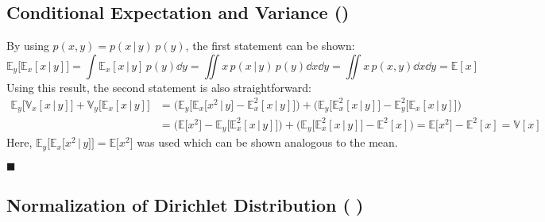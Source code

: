 \documentclass[11pt, a4paper]{scrartcl}
\newcommand{\E}{\mathbb{E}}
\newcommand{\Var}{\mathbb{V}}
\newcommand{\given}{\,\vert\,}
\newcommand{\biggiven}{\,\big\vert\,}
\newcommand{\eot}{\hfill\(\blacksquare\)}
\newcommand{\diffstar}{\texorpdfstring{\raisebox{-1pt}{\resizebox{!}{8pt}{\(\star\)}}}{*}}
\newcommand{\onestar}  {(\diffstar)}
\newcommand{\threestar}{(\diffstar\,\diffstar\,\diffstar)}
\begin{document}
		\subsection{Conditional Expectation and Variance  \onestar}
			By using \( p(x, y) = p(x \given y) \, p(y) \), the first statement can be shown:
			\begin{equation}
				\E_y\big[ \E_x[x \given y] \big]
					= \int\! \E_x[x \given y] \, p(y) \dd{y}
					= \iint\! x \, p(x \given y) \, p(y) \dd{x} \dd{y}
					= \iint\! x \, p(x, y) \dd{x} \dd{y}
					= \E[x]
			\end{equation}
			Using this result, the second statement is also straightforward:
			\begin{align}
				\E_y\big[ \Var_x[x \given y] \big] + \Var_y\big[ \E_x[x \given y] \big]
					&= \Big( \E_y\big[ \E_x\big[x^2 \biggiven y\big] - \E_x^2[x \given y] \big] \Big) + \Big( \E_y\big[ \E_x^2[x \given y] \big] - \E_y^2\big[ \E_x[x \given y] \big] \Big) \\
					&= \Big( \E\big[x^2\big] - \E_y\big[ \E_x^2[x \given y] \big] \Big) + \Big( \E_y\big[ \E_x^2[x \given y] \big] - \E^2[x] \Big)
					 = \E\big[x^2\big] - \E^2[x]
					 = \Var[x]
			\end{align}
			Here, \( \E_y\big[ \E_x\big[x^2 \biggiven y\big] \big] = \E\big[x^2\big] \) was used which can be shown analogous to the mean.

			\eot

		\subsection{Normalization of Dirichlet Distribution  \threestar}
\end{document}
